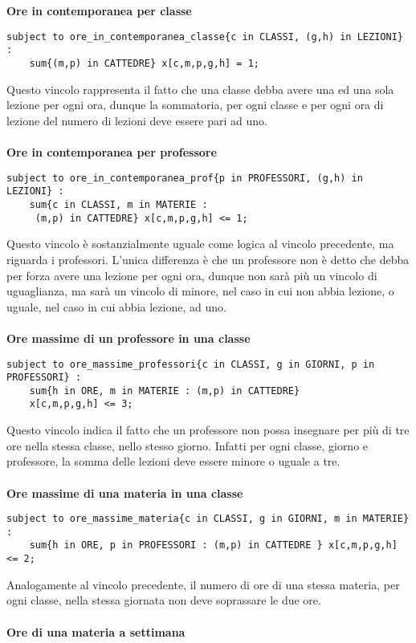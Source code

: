 \documentclass{article}
\begin{document}
\\\\\textbf{Ore in contemporanea per classe}
\begin{verbatim}
subject to ore_in_contemporanea_classe{c in CLASSI, (g,h) in LEZIONI} :
	sum{(m,p) in CATTEDRE} x[c,m,p,g,h] = 1;
\end{verbatim}
Questo vincolo rappresenta il fatto che una classe debba avere una ed una sola lezione per ogni ora, dunque la sommatoria, per ogni classe e per ogni ora di lezione del numero di lezioni deve essere pari ad uno.
\\\\\textbf{Ore in contemporanea per professore}
\begin{verbatim}
subject to ore_in_contemporanea_prof{p in PROFESSORI, (g,h) in LEZIONI} :
	sum{c in CLASSI, m in MATERIE : 
	 (m,p) in CATTEDRE} x[c,m,p,g,h] <= 1;
\end{verbatim}
Questo vincolo è sostanzialmente uguale come logica al vincolo precedente, ma riguarda i professori. L'unica differenza è che un professore non è detto che debba per forza avere una lezione per ogni ora, dunque non sarà più un vincolo di uguaglianza, ma sarà un vincolo di minore, nel caso in cui non abbia lezione, o uguale, nel caso in cui abbia lezione, ad uno.
\\\\\textbf{Ore massime di un professore in una classe}
\begin{verbatim}
subject to ore_massime_professori{c in CLASSI, g in GIORNI, p in PROFESSORI} :
	sum{h in ORE, m in MATERIE : (m,p) in CATTEDRE}
	x[c,m,p,g,h] <= 3;
\end{verbatim}
Questo vincolo indica il fatto che un professore non possa insegnare per più di tre ore nella stessa classe, nello stesso giorno. Infatti per ogni classe, giorno e professore, la somma delle lezioni deve essere minore o uguale a tre.
\\\\\textbf{Ore massime di una materia in una classe}
\begin{verbatim}
subject to ore_massime_materia{c in CLASSI, g in GIORNI, m in MATERIE} :
	sum{h in ORE, p in PROFESSORI : (m,p) in CATTEDRE } x[c,m,p,g,h] <= 2;
\end{verbatim}
Analogamente al vincolo precedente, il numero di ore di una stessa materia, per ogni classe, nella stessa giornata non deve soprassare le due ore.
\\\\\textbf{Ore di una materia a settimana}
\end{document}
